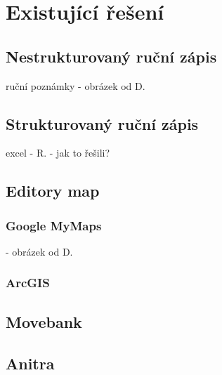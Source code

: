 
\chapter{Existující řešení}


\section{Nestrukturovaný ruční zápis}

ruční poznámky - obrázek od D.

\section{Strukturovaný ruční zápis}

excel - R. - jak to řešili?

\section{Editory map}

\subsection{Google MyMaps}

- obrázek od D.

\subsection{ArcGIS}

\section{Movebank}

\section{Anitra}